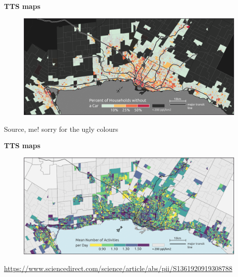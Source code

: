 \documentclass[aspectratio=169]{beamer}
\begin{document}
\begin{frame}
	
	\textbf{TTS maps}
	
	\begin{figure}
		\centering
		\includegraphics[width=1\linewidth]{images/E_choro_nocar.png}
	\end{figure}

	\tiny Source, me! sorry for the ugly colours
	
\end{frame}



\begin{frame}
	
	\textbf{TTS maps}
	
	\begin{figure}
		\centering
		\includegraphics[width=1\linewidth]{images/E_choro_acts.png}
	\end{figure}

	\tiny \url{https://www.sciencedirect.com/science/article/abs/pii/S1361920919308788}
	
\end{frame}
\end{document}

